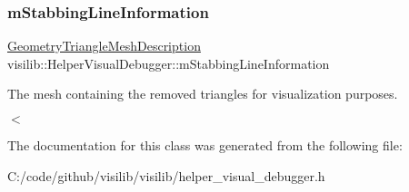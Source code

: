 \subsubsection{\texorpdfstring{mStabbingLineInformation}{mStabbingLineInformation}}
{\footnotesize\ttfamily \mbox{\hyperlink{structvisilib_1_1_geometry_triangle_mesh_description}{Geometry\+Triangle\+Mesh\+Description}} visilib\+::\+Helper\+Visual\+Debugger\+::m\+Stabbing\+Line\+Information\hspace{0.3cm}{\ttfamily [private]}}



The mesh containing the removed triangles for visualization purposes. 

$<$ 

The documentation for this class was generated from the following file\+:\begin{DoxyCompactItemize}
\item 
C\+:/code/github/visilib/visilib/helper\+\_\+visual\+\_\+debugger.\+h\end{DoxyCompactItemize}
